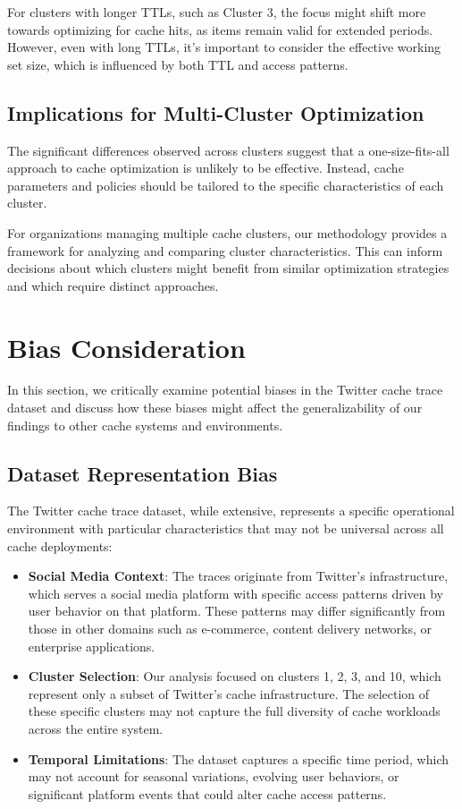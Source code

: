 \documentclass[conference]{IEEEtran}
\begin{document}
For clusters with longer TTLs, such as Cluster 3, the focus might shift more towards optimizing for cache hits, as items remain valid for extended periods. However, even with long TTLs, it's important to consider the effective working set size, which is influenced by both TTL and access patterns.

\subsection{Implications for Multi-Cluster Optimization}
The significant differences observed across clusters suggest that a one-size-fits-all approach to cache optimization is unlikely to be effective. Instead, cache parameters and policies should be tailored to the specific characteristics of each cluster.

For organizations managing multiple cache clusters, our methodology provides a framework for analyzing and comparing cluster characteristics. This can inform decisions about which clusters might benefit from similar optimization strategies and which require distinct approaches.

\section{Bias Consideration}

In this section, we critically examine potential biases in the Twitter cache trace dataset and discuss how these biases might affect the generalizability of our findings to other cache systems and environments.

\subsection{Dataset Representation Bias}

The Twitter cache trace dataset, while extensive, represents a specific operational environment with particular characteristics that may not be universal across all cache deployments:

\begin{itemize}
    \item \textbf{Social Media Context}: The traces originate from Twitter's infrastructure, which serves a social media platform with specific access patterns driven by user behavior on that platform. These patterns may differ significantly from those in other domains such as e-commerce, content delivery networks, or enterprise applications.
    
    \item \textbf{Cluster Selection}: Our analysis focused on clusters 1, 2, 3, and 10, which represent only a subset of Twitter's cache infrastructure. The selection of these specific clusters may not capture the full diversity of cache workloads across the entire system.
    
    \item \textbf{Temporal Limitations}: The dataset captures a specific time period, which may not account for seasonal variations, evolving user behaviors, or significant platform events that could alter cache access patterns.
\end{itemize}
\end{document}
